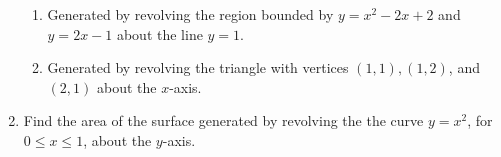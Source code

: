 \documentclass[12pt]{article}
\begin{document}
\begin{enumerate}
\begin{enumerate}
 \item Generated by revolving the region bounded by $y=x^2-2x+2$ and $y=2x-1$ about the line $y=1$.

\vspace{2.5in}

 \item Generated by revolving the triangle with vertices $(1,1), (1,2)$, and $(2,1)$ about the $x$-axis.
 
\vspace{2.5in}
\end{enumerate}




\item Find the area of the surface generated by revolving the the curve $y=x^2$, for $0\leq x\leq 1$, about the $y$-axis.
 
\end{enumerate}
\end{document}
